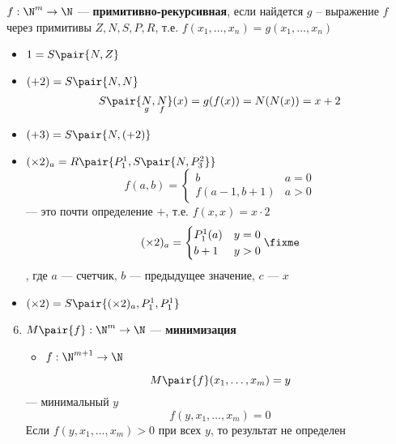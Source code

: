 \documentclass[oneside]{book}
\begin{document}
\begin{definition}
	\(f: \N^m \to \N\) --- \textbf{примитивно-рекурсивная}, если найдется \(g\) -- выражение \(f\) через примитивы \(Z, N, S, P, R\), т.е. \(f(x_1, \dots, x_n) = g(x_1, \dots, x_n)\)
	\label{org6765eb3}
\end{definition}
\begin{examp}
	\-
	\begin{itemize}
		\item \(1 = S\pair{N, Z}\)
		\item \((+2) = S\pair{N, N}\)
		      \[ S\pair{\underset{g}{N}, \underset{f}{N}}(x) = g(f(x)) = N(N(x)) = x + 2 \]
		\item \((+3) = S\pair{N, (+2)}\)
		\item \((\times 2)_a = R\pair{P^1_1, S\pair{N, P^2_3}}\)
		      \[ f(a, b) = \begin{cases}
				      b               & a = 0 \\
				      f(a - 1, b + 1) & a > 0
			      \end{cases} \]
		      --- это почти определение \(+\), т.е. \(f(x, x) = x\cdot 2\)
		      \[ (\times 2)_a = \begin{cases}
				      P^1_1(a) & y = 0 \\
				      b + 1    & y > 0
			      \end{cases} \fixme \]
		      , где \(a\) --- счетчик, \(b\) --- предыдущее значение, \(c\) --- \(x\)
		\item \((\times 2) = S \pair{(\times 2)_a, P^1_1, P^1_1}\)
	\end{itemize}
\end{examp}
\begin{definition}
	\-
	\begin{enumerate}
		\setcounter{enumi}{5}
		\item \(M\pair{f}: \N^m \to \N\) --- \textbf{минимизация}
		      \begin{itemize}
			      \item \(f: \N^{m + 1} \to \N\)
		      \end{itemize}
		      \[ M\pair{f}(x_1, \dots, x_m) = y \]
		      --- минимальный \(y\)
		      \[ f(y, x_1, \dots, x_m) = 0 \]
		      Если \(f(y, x_1, \dots, x_m) > 0\) при всех \(y\), то результат не определен
	\end{enumerate}
	\label{org501205b}
\end{definition}
\end{document}
